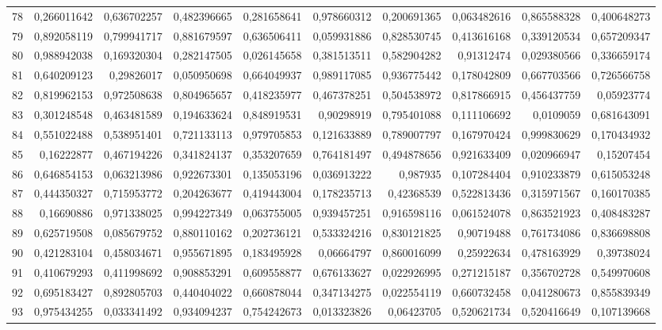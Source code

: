 \documentclass{article}
\begin{document}
\begin{landscape}
\begin{longtable}{lrrrrrrrrr}
78	&	0,266011642	&	0,636702257	&	0,482396665	&	0,281658641	&	0,978660312	&	0,200691365	&	0,063482616	&	0,865588328	&	0,400648273	\\
79	&	0,892058119	&	0,799941717	&	0,881679597	&	0,636506411	&	0,059931886	&	0,828530745	&	0,413616168	&	0,339120534	&	0,657209347	\\
80	&	0,988942038	&	0,169320304	&	0,282147505	&	0,026145658	&	0,381513511	&	0,582904282	&	0,91312474	&	0,029380566	&	0,336659174	\\
81	&	0,640209123	&	0,29826017	&	0,050950698	&	0,664049937	&	0,989117085	&	0,936775442	&	0,178042809	&	0,667703566	&	0,726566758	\\
82	&	0,819962153	&	0,972508638	&	0,804965657	&	0,418235977	&	0,467378251	&	0,504538972	&	0,817866915	&	0,456437759	&	0,05923774	\\
83	&	0,301248548	&	0,463481589	&	0,194633624	&	0,848919531	&	0,90298919	&	0,795401088	&	0,111106692	&	0,0109059	&	0,681643091	\\
84	&	0,551022488	&	0,538951401	&	0,721133113	&	0,979705853	&	0,121633889	&	0,789007797	&	0,167970424	&	0,999830629	&	0,170434932	\\
85	&	0,16222877	&	0,467194226	&	0,341824137	&	0,353207659	&	0,764181497	&	0,494878656	&	0,921633409	&	0,020966947	&	0,15207454	\\
86	&	0,646854153	&	0,063213986	&	0,922673301	&	0,135053196	&	0,036913222	&	0,987935	&	0,107284404	&	0,910233879	&	0,615053248	\\
87	&	0,444350327	&	0,715953772	&	0,204263677	&	0,419443004	&	0,178235713	&	0,42368539	&	0,522813436	&	0,315971567	&	0,160170385	\\
88	&	0,16690886	&	0,971338025	&	0,994227349	&	0,063755005	&	0,939457251	&	0,916598116	&	0,061524078	&	0,863521923	&	0,408483287	\\
89	&	0,625719508	&	0,085679752	&	0,880110162	&	0,202736121	&	0,533324216	&	0,830121825	&	0,90719488	&	0,761734086	&	0,836698808	\\
90	&	0,421283104	&	0,458034671	&	0,955671895	&	0,183495928	&	0,06664797	&	0,860016099	&	0,25922634	&	0,478163929	&	0,39738024	\\
91	&	0,410679293	&	0,411998692	&	0,908853291	&	0,609558877	&	0,676133627	&	0,022926995	&	0,271215187	&	0,356702728	&	0,549970608	\\
92	&	0,695183427	&	0,892805703	&	0,440404022	&	0,660878044	&	0,347134275	&	0,022554119	&	0,660732458	&	0,041280673	&	0,855839349	\\
93	&	0,975434255	&	0,033341492	&	0,934094237	&	0,754242673	&	0,013323826	&	0,06423705	&	0,520621734	&	0,520416649	&	0,107139668	\\

\end{longtable}
\end{landscape}
\end{document}
